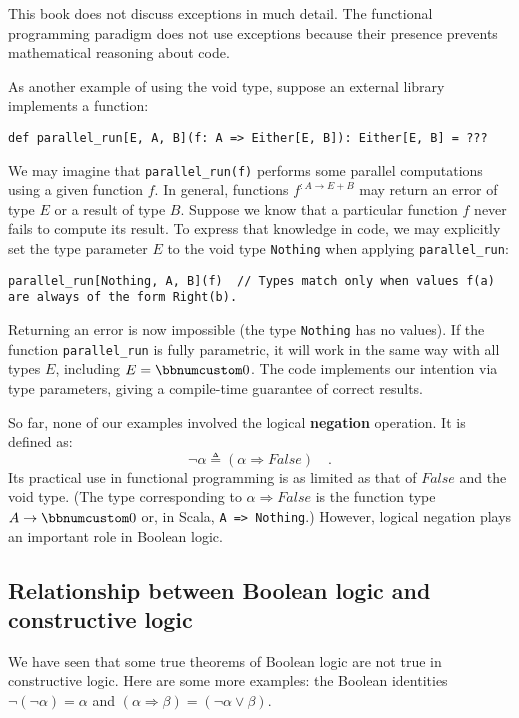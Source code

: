 This book does not discuss exceptions in much detail. The functional
programming paradigm does not use exceptions because their presence
prevents mathematical reasoning about code.

As another example of using the void type, suppose an external library
implements a function:
\begin{lstlisting}
def parallel_run[E, A, B](f: A => Either[E, B]): Either[E, B] = ???
\end{lstlisting}
We may imagine that \lstinline!parallel_run(f)! performs some parallel
computations using a given function $f$. In general, functions $f^{:A\rightarrow E+B}$
may return an error of type $E$ or a result of type $B$. Suppose
we know that a particular function $f$ never fails to compute its
result. To express that knowledge in code, we may explicitly set the
type parameter $E$ to the void type \lstinline!Nothing! when applying
\lstinline!parallel_run!:
\begin{lstlisting}
parallel_run[Nothing, A, B](f)  // Types match only when values f(a) are always of the form Right(b). 
\end{lstlisting}
Returning an error is now impossible (the type \lstinline!Nothing!
has no values). If the function \lstinline!parallel_run! is fully
parametric, it will work in the same way with all types $E$, including
$E=\bbnum 0$. The code implements our intention via type parameters,
giving a compile-time guarantee of correct results.

So far, none of our examples involved the logical \textbf{negation}
operation. It is defined as:
\[
\neg\alpha\triangleq(\alpha\Rightarrow False)\quad.
\]
Its practical use in functional programming is as limited as that
of $False$ and the void type. (The type corresponding to $\alpha\Rightarrow False$
is the function type $A\rightarrow\bbnum 0$ or, in Scala, \lstinline!A => Nothing!.)
However, logical negation plays an important role in Boolean logic.

\subsection{Relationship between Boolean logic and constructive logic\label{subsec:Relationship-between-Boolean} }

We have seen that some true theorems of Boolean logic are not true
in constructive logic. Here are some more examples: the Boolean identities
$\neg\left(\neg\alpha\right)=\alpha$ and $\left(\alpha\Rightarrow\beta\right)=(\neg\alpha\vee\beta)$.

